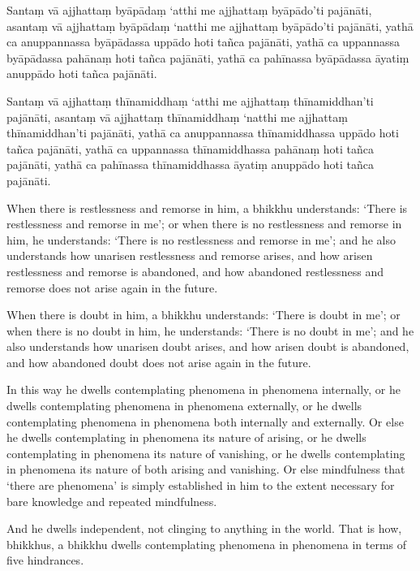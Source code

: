 Santaṃ vā ajjhattaṃ byāpādaṃ ‘atthi me ajjhattaṃ byāpādo’ti pajānāti,
asantaṃ vā ajjhattaṃ byāpādaṃ ‘natthi me ajjhattaṃ byāpādo’ti pajānāti,
yathā ca anuppannassa byāpādassa uppādo hoti tañca pajānāti,
yathā ca uppannassa byāpādassa pahānaṃ hoti tañca pajānāti,
yathā ca pahīnassa byāpādassa āyatiṃ anuppādo hoti tañca pajānāti.

Santaṃ vā ajjhattaṃ thīnamiddhaṃ ‘atthi me ajjhattaṃ thīnamiddhan’ti pajānāti,
asantaṃ vā ajjhattaṃ thīnamiddhaṃ ‘natthi me ajjhattaṃ thīnamiddhan’ti pajānāti,
yathā ca anuppannassa thīnamiddhassa uppādo hoti tañca pajānāti,
yathā ca uppannassa thīnamiddhassa pahānaṃ hoti tañca pajānāti,
yathā ca pahīnassa thīnamiddhassa āyatiṃ anuppādo hoti tañca pajānāti.

\englishPage

When there is restlessness and remorse in him, a bhikkhu understands:
`There is restlessness and remorse in me';
or when there is no restlessness and remorse in him, he understands:
`There is no restlessness and remorse in me';
and he also understands how unarisen restlessness and remorse arises,
and how arisen restlessness and remorse is abandoned,
and how abandoned restlessness and remorse does not arise again in the future.

When there is doubt in him, a bhikkhu understands:
`There is doubt in me';
or when there is no doubt in him, he understands:
`There is no doubt in me';
and he also understands how unarisen doubt arises,
and how arisen doubt is abandoned,
and how abandoned doubt does not arise again in the future.

In this way he dwells contemplating phenomena in phenomena internally, or he
dwells contemplating phenomena in phenomena externally, or he dwells
contemplating phenomena in phenomena both internally and externally. Or else he
dwells contemplating in phenomena its nature of arising, or he dwells
contemplating in phenomena its nature of vanishing, or he dwells contemplating
in phenomena its nature of both arising and vanishing. Or else mindfulness that
‘there are phenomena’ is simply established in him to the extent necessary for
bare knowledge and repeated mindfulness.

And he dwells independent, not clinging to anything in the world. That is how,
bhikkhus, a bhikkhu dwells contemplating phenomena in phenomena in terms of five
hindrances.


\paliPage

